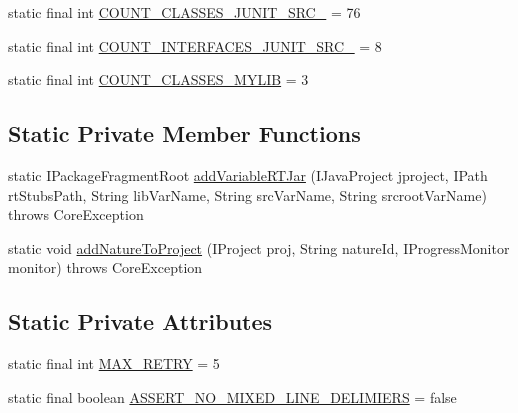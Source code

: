 \begin{DoxyCompactItemize}
\item 
static final int \hyperlink{classorg_1_1eclipse_1_1jdt_1_1ui_1_1tests_1_1refactoring_1_1infra_1_1JavaProjectHelper_af0167a048adf755595853c19ef30b60d}{COUNT\_\-CLASSES\_\-JUNIT\_\-SRC\_} = 76
\item 
static final int \hyperlink{classorg_1_1eclipse_1_1jdt_1_1ui_1_1tests_1_1refactoring_1_1infra_1_1JavaProjectHelper_a23d9cfacb334a7bded4ec4295b154352}{COUNT\_\-INTERFACES\_\-JUNIT\_\-SRC\_} = 8
\item 
static final int \hyperlink{classorg_1_1eclipse_1_1jdt_1_1ui_1_1tests_1_1refactoring_1_1infra_1_1JavaProjectHelper_a0f75bcd17ac6c7fa55810a720858020a}{COUNT\_\-CLASSES\_\-MYLIB} = 3
\end{DoxyCompactItemize}
\subsection*{Static Private Member Functions}
\begin{DoxyCompactItemize}
\item 
static IPackageFragmentRoot \hyperlink{classorg_1_1eclipse_1_1jdt_1_1ui_1_1tests_1_1refactoring_1_1infra_1_1JavaProjectHelper_ab0a541cfde36b441aa12978bc895e346}{addVariableRTJar} (IJavaProject jproject, IPath rtStubsPath, String libVarName, String srcVarName, String srcrootVarName)  throws CoreException 
\item 
static void \hyperlink{classorg_1_1eclipse_1_1jdt_1_1ui_1_1tests_1_1refactoring_1_1infra_1_1JavaProjectHelper_a3c33aa465ac14609504c8c7a013c36b7}{addNatureToProject} (IProject proj, String natureId, IProgressMonitor monitor)  throws CoreException 
\end{DoxyCompactItemize}
\subsection*{Static Private Attributes}
\begin{DoxyCompactItemize}
\item 
static final int \hyperlink{classorg_1_1eclipse_1_1jdt_1_1ui_1_1tests_1_1refactoring_1_1infra_1_1JavaProjectHelper_a8b45a289f9403a104b4262a119f82351}{MAX\_\-RETRY} = 5
\item 
static final boolean \hyperlink{classorg_1_1eclipse_1_1jdt_1_1ui_1_1tests_1_1refactoring_1_1infra_1_1JavaProjectHelper_ae1a510c7b10dbf64cd95cc379d58a350}{ASSERT\_\-NO\_\-MIXED\_\-LINE\_\-DELIMIERS} = false
\end{DoxyCompactItemize}


